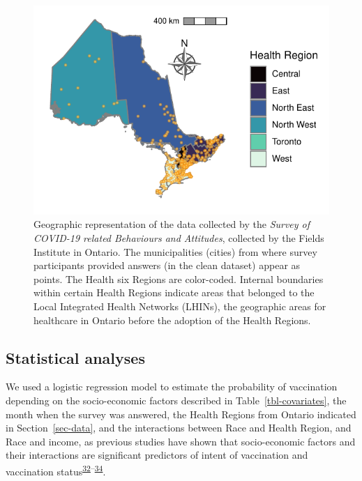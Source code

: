 \documentclass[
  letterpaper,
  DIV=11,
  numbers=noendperiod]{scrartcl}
\begin{document}
\begin{figure}

{\centering \includegraphics{../data/map_data/map.pdf}

}

\caption{\label{fig-map}Geographic representation of the data collected
by the \emph{Survey of COVID-19 related Behaviours and Attitudes},
collected by the Fields Institute in Ontario. The municipalities
(cities) from where survey participants provided answers (in the clean
dataset) appear as points. The Health six Regions are color-coded.
Internal boundaries within certain Health Regions indicate areas that
belonged to the Local Integrated Health Networks (LHINs), the geographic
areas for healthcare in Ontario before the adoption of the Health
Regions.}

\end{figure}

\hypertarget{statistical-analyses}{%
\subsection{Statistical analyses}\label{statistical-analyses}}

We used a logistic regression model to estimate the probability of
vaccination depending on the socio-economic factors described in
Table~\ref{tbl-covariates}, the month when the survey was answered, the
Health Regions from Ontario indicated in Section~\ref{sec-data}, and the
interactions between Race and Health Region, and Race and income, as
previous studies have shown that socio-economic factors and their
interactions are significant predictors of intent of vaccination and
vaccination
status\textsuperscript{\protect\hyperlink{ref-nguyen2022}{32}--\protect\hyperlink{ref-cnat2022a}{34}}.
\end{document}

